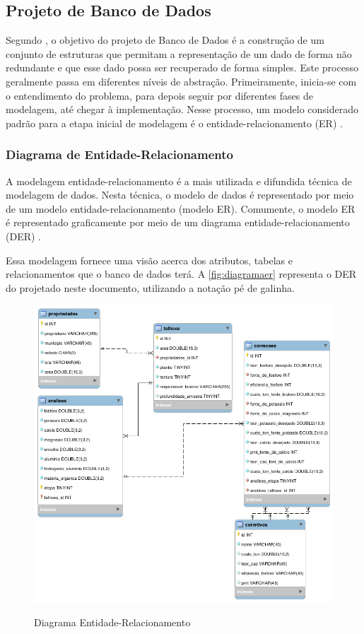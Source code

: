 \subsection{Projeto de Banco de Dados}
\label{sec:titSecBancoDados}

Segundo , o objetivo do projeto de Banco de Dados é a construção de um conjunto de estruturas que permitam a representação de um dado de forma não redundante e que esse dado possa ser recuperado de forma simples. Este processo geralmente passa em diferentes níveis de abstração. Primeiramente, inicia-se com o entendimento do problema, para depois seguir por diferentes fases de modelagem, até chegar à implementação. Nesse processo, um modelo considerado padrão para a etapa inicial de modelagem é o entidade-relacionamento (ER) \cite{heuser2009projeto}.

\subsubsection{Diagrama de Entidade-Relacionamento}
\label{sec:titSecDiagER}

A modelagem entidade-relacionamento é a mais utilizada e difundida técnica de modelagem de dados. Nesta técnica, o modelo de dados é representado por meio de um modelo entidade-relacionamento (modelo ER). Comumente, o modelo ER é representado graficamente por meio de um diagrama entidade-relacionamento (DER) \cite{heuser2009projeto}.

Essa modelagem fornece uma visão acerca dos atributos, tabelas e relacionamentos que o banco de dados terá. A \autoref{fig:diagramaer} representa o DER do projetado neste documento, utilizando a notação pé de galinha.

\begin{figure}[H]
    \centering
    \caption{Diagrama Entidade-Relacionamento}
    \includegraphics[width=13cm]{./dados/analise/diagramaer.png}
    \label{fig:diagramaer}
\end{figure}

